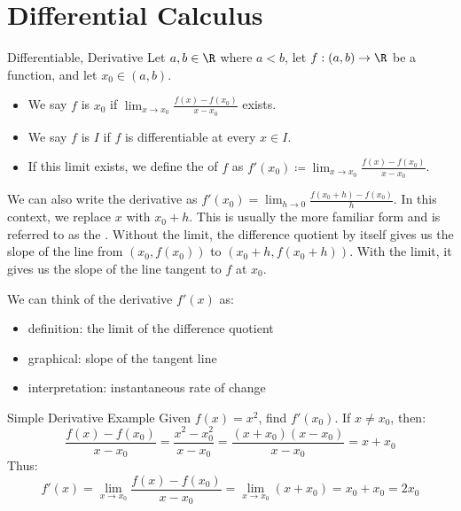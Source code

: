 \chapter{Differential Calculus}

\begin{dfnbox}{Differentiable, Derivative}{}
    Let $a,b \in \R$ where $a < b$, let $f : (a,b) \to \R$ be a function, and let $x_0 \in (a,b)$.
    \begin{itemize}
        \item We say $f$ is  $x_0$ if $\lim_{x \to x_0} \frac{f(x) - f(x_0)}{x - x_0}$ exists.
        \item We say $f$ is  $I$ if $f$ is differentiable at every $x \in I$.
        \item If this limit exists, we define the  of $f$ as $f\prime(x_0) \coloneq \lim_{x \to x_0} \frac{f(x) - f(x_0)}{x - x_0}$.
    \end{itemize}
\end{dfnbox}

We can also write the derivative as $ f\prime(x_0) = \lim_{h \to 0} \frac{f(x_0+h) - f(x_0)}{h}$. In this context, we replace $x$ with $x_0 + h$. This is usually the more familiar form and is referred to as the . Without the limit, the difference quotient by itself gives us the slope of the line from $(x_0, f(x_0))$ to $(x_0+h, f(x_0+h))$. With the limit, it gives us the slope of the line tangent to $f$ at $x_0$.

We can think of the derivative $f\prime(x)$ as:
\begin{itemize}
    \item definition: the limit of the difference quotient
    \item graphical: slope of the tangent line
    \item interpretation: instantaneous rate of change
\end{itemize}

\begin{exbox}{Simple Derivative Example}{}
    Given $f(x) = x^2$, find $f\prime(x_0)$.
    \tcblower
    If $x \neq x_0$, then:
    \[ \frac{f(x) - f(x_0)}{x - x_0} = \frac{x^2 - x_0^2}{x - x_0} = \frac{(x + x_0)(x - x_0)}{x - x_0} = x + x_0 \]
    Thus:
    \[ f\prime (x) = \lim_{x \to x_0} \frac{f(x) - f(x_0)}{x - x_0} = \lim_{x \to x_0} (x + x_0) = x_0 + x_0 = 2x_0 \]
\end{exbox}

